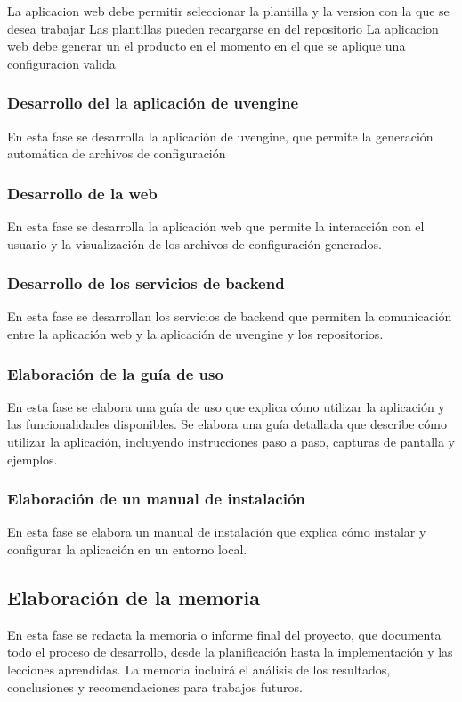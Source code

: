 \documentclass[12pt, a4paper, twoside]{article}
\begin{document}
La aplicacion web debe permitir seleccionar la plantilla y la version con la que se desea trabajar 
Las plantillas pueden recargarse en del repositorio 
La aplicacion web debe generar un el producto en el momento en el que se aplique una configuracion valida 

\subsubsection{Desarrollo del la aplicación de uvengine }
En esta fase se desarrolla la aplicación de uvengine, que permite la generación automática de archivos de configuración
\subsubsection{Desarrollo de la web}
En esta fase se desarrolla la aplicación web que permite la interacción con el usuario y la visualización de los archivos de configuración generados.
\subsubsection{Desarrollo de los servicios de backend}
En esta fase se desarrollan los servicios de backend que permiten la comunicación entre la aplicación web y la aplicación de uvengine y los repositorios.
\subsubsection{Elaboración de la guía de uso}
En esta fase se elabora una guía de uso que explica cómo utilizar la aplicación y las funcionalidades disponibles.
Se elabora una guía detallada que describe cómo utilizar la aplicación, incluyendo instrucciones paso a paso, capturas 
de pantalla y ejemplos. 
\subsubsection{Elaboración de un manual de instalación}
En esta fase se elabora un manual de instalación que explica cómo instalar y configurar la aplicación en un entorno local.
\subsection{Elaboración de la memoria}
En esta fase se redacta la memoria o informe final del proyecto, que documenta todo el proceso de desarrollo, desde la 
planificación hasta la implementación y las lecciones aprendidas. La memoria incluirá el análisis de los resultados, 
conclusiones y recomendaciones para trabajos futuros. 
\end{document}
